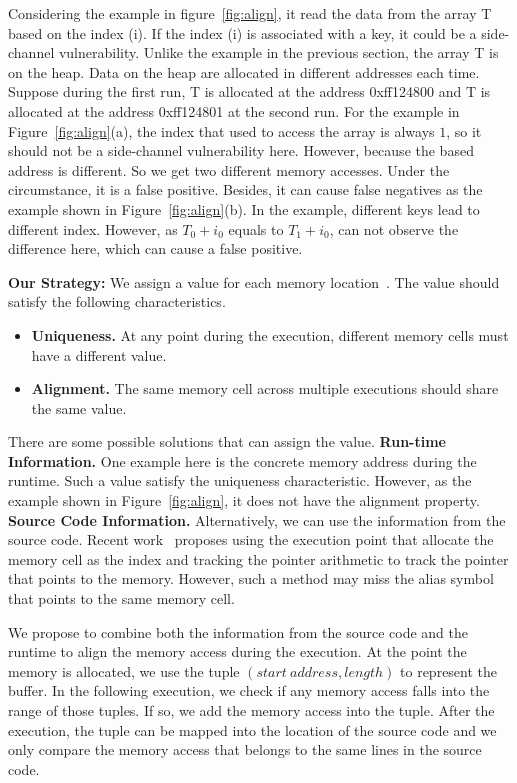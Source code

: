 Considering the example in figure~\ref{fig:align}, it read the data from the array \textsf{T} based on the index (i). If the index (i) is associated with a key, it could be a side-channel vulnerability. Unlike the example in the previous section, the array \textsf{T} is on the heap. Data on the heap are allocated in different addresses each time. Suppose during the first run, \textsf{T} is allocated at the address \textsf{0xff124800} and \textsf{T} is allocated at the address \textsf{0xff124801} at the second run. For the example in Figure~\ref{fig:align}(a), the index that used to access the array is always $1$, so it should not be a side-channel vulnerability here. However, because the based address is different. So we get two different memory accesses. Under the circumstance, it is a false positive. Besides, it can cause false negatives as the example shown in Figure~\ref{fig:align}(b). In the example, different keys lead to different index. However, as $T_0 + i_0$ equals to $T_1 + i_0$, \tool{} can not observe the difference here, which can cause a false positive.

\textbf{Our Strategy: } We assign a value for each memory location~\cite{sumner2010memory}. The value should satisfy the following characteristics.
\begin{itemize}
  \item \textbf{Uniqueness.} At any point during the execution, different memory cells must have a different value.
  \item \textbf{Alignment.} The same memory cell across multiple executions should share the same value.
\end{itemize}

There are some possible solutions that can assign the value.
\textbf{Run-time Information.} One example here is the concrete memory address during the runtime. Such a value satisfy the uniqueness characteristic. However, as the example shown in Figure~\ref{fig:align}, it does not have the alignment property.
\textbf{Source Code Information.} Alternatively, we can use the information from the source code. Recent work~\cite{sumner2010memory} proposes using the execution point that allocate the memory cell as the index and tracking the pointer arithmetic to track the pointer that points to the memory. However, such a method may miss the alias symbol that points to the same memory cell.

We propose to combine both the information from the source code and the runtime to align the memory access during the execution. At the point the memory is allocated, we use the tuple $(start\ address, length)$ to represent the buffer. In the following execution, we check if any memory access falls into the range of those tuples. If so, we add the memory access into the tuple. After the execution, the tuple can be mapped into the location of the source code and we only compare the memory access that belongs to the same lines in the source code.

